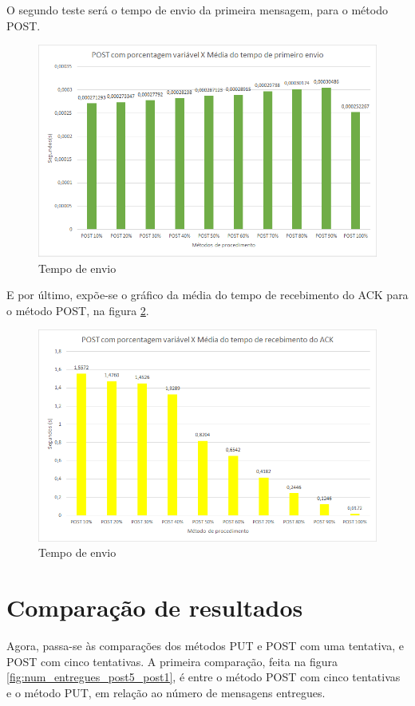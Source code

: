 O segundo teste será o tempo de envio da primeira mensagem, para o método POST.

\begin{figure}[!htb]
	\centering
	\includegraphics[width=.8\textwidth]{../imagens/POSTxPrimeiroEnvio}
	\caption{Tempo de envio}
	\label{fig:post_tempo_envio}
\end{figure}

E por último, expõe-se o gráfico da média do tempo de recebimento do ACK para o método POST, na figura \ref{fig:post_media_tempo_ACK}.

\begin{figure}[!htb]
	\centering
	\includegraphics[width=.8\textwidth]{../imagens/POSTxMediatempopacoteentregue}
	\caption{Tempo de envio}
	\label{fig:post_media_tempo_ACK}
\end{figure}

\hfill \break
\hfill \break
\hfill \break

\section{Comparação de resultados}

Agora, passa-se às comparações dos métodos PUT e POST com uma tentativa, e POST com cinco tentativas.
A primeira comparação, feita na figura \ref{fig:num_entregues_post5_post1}, é entre o método POST com cinco tentativas e o método PUT, em relação ao número de mensagens entregues.

